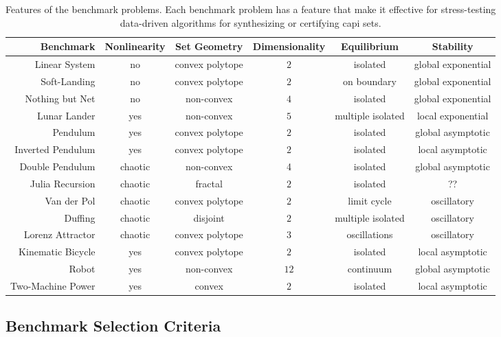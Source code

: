 \noindent\begin{table}[t]
\centering
\begin{tabular}{|r|ccccc|}
\hline
Benchmark & Nonlinearity & Set Geometry & Dimensionality & Equilibrium & Stability \\ \hline
Linear System & no & convex polytope & $2$ & isolated & global exponential \\
Soft-Landing & no & convex polytope & $2$ & on boundary & global exponential \\
Nothing but Net & no & non-convex & $4$ & isolated  & global exponential \\
Lunar Lander & yes & non-convex & $5$ & multiple isolated  & local exponential \\
Pendulum & yes & convex polytope & $2$ & isolated & global asymptotic \\
Inverted Pendulum & yes & convex polytope & $2$ & isolated & local asymptotic \\
Double Pendulum & chaotic & non-convex & 4 & isolated & global asymptotic \\
Julia Recursion & chaotic & fractal & $2$ & isolated & ?? \\
Van der Pol & chaotic & convex polytope & $2$ & limit cycle & oscillatory  \\
Duffing & chaotic & disjoint & $2$ & multiple isolated & oscillatory \\
Lorenz Attractor & chaotic & convex polytope & $3$ & oscillations & oscillatory \\
Kinematic Bicycle & yes & convex polytope & $2$ & isolated & local asymptotic \\
Robot & yes & non-convex & $12$ & continuum & global asymptotic \\
Two-Machine Power & yes & convex & $2$ & isolated & local asymptotic \\
\hline
    \end{tabular}
\caption{Features of the benchmark problems. Each benchmark problem has a feature that make it effective for stress-testing data-driven algorithms for synthesizing or certifying \ac{capi} sets.}
\label{tab:benchmarks}
\end{table}

\subsection{Benchmark Selection Criteria}

